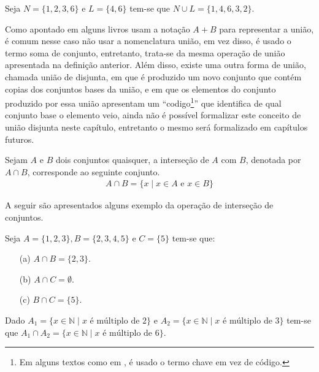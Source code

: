\begin{exemplo}\label{exe:UniaoConjuntos2}
  Seja $N = \{1, 2, 3, 6\}$ e $L = \{4, 6\}$ tem-se que $N \cup L = \{1, 4, 6, 3, 2\}$.
\end{exemplo}

Como apontado em \cite{lipschutz1978-TC} alguns livros usam a notação $A + B$ para representar a união, é comum nesse caso não usar a nomenclatura união, em vez disso, é usado o termo soma de conjunto, entretanto, trata-se da mesma operação de união apresentada na definição anterior. Além disso, existe uma outra forma de união, chamada união de disjunta, em que é produzido um novo conjunto que contém copias dos conjuntos bases da união, e em que os elementos do conjunto produzido por essa união apresentam um ``codigo\footnote{Em alguns textos como em \cite{carmo2013}, é usado o termo chave em vez de código.}'' que identifica de qual conjunto base o elemento veio, ainda não é possível formalizar este conceito de união disjunta neste capítulo, entretanto o mesmo será formalizado em capítulos futuros.

\begin{definicao}\label{def:IntersecaoConjuntos}
	Sejam $A$ e $B$ dois conjuntos quaisquer, a interseção de $A$ com $B$, denotada por $A \cap B$, corresponde ao seguinte conjunto.
  \begin{eqnarray*}
    A \cap B = \{x \mid x \in A \mbox{ e } x \in B\}
  \end{eqnarray*}
\end{definicao}

A seguir são apresentados alguns exemplo da operação de interseção de conjuntos.

\begin{exemplo}\label{exe:IntersecaoConjuntos1}
  Seja $A = \{1, 2, 3\}, B = \{2, 3, 4, 5\}$ e $C = \{5\}$ tem-se que:
	\begin{itemize}
		\item[(a)] $A \cap B = \{2, 3\}$.
		\item[(b)] $A \cap C = \emptyset$.
		\item[(c)] $B \cap C = \{5\}$.
	\end{itemize}
\end{exemplo}

\begin{exemplo}\label{exe:IntersecaoConjuntos2}
  Dado $A_1 = \{x \in \mathbb{N} \mid x \mbox{ é múltiplo de } 2\}$ e $A_2 = \{x \in \mathbb{N} \mid x \mbox{ é múltiplo de } 3\}$ tem-se que $A_1 \cap A_2 = \{x \in \mathbb{N} \mid x \mbox{ é múltiplo de } 6\}$.
\end{exemplo}

